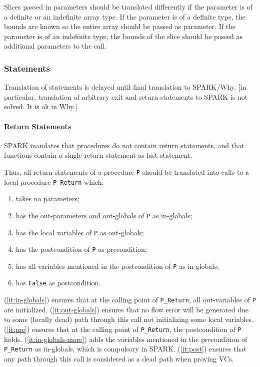 \documentclass{article}
\begin{document}
Slices passed in parameters should be translated differently if the parameter
is of a definite or an indefinite array type. If the parameter is of a definite
type, the bounds are known so the entire array should be passed as
parameter. If the parameter is of an indefinite type, the bounds of the slice
should be passed as additional parameters to the call.

\subsubsection{Statements}

Translation of statements is delayed until final translation to SPARK/Why. [in
particular, translation of arbitrary exit and return statements to SPARK is not
solved. It is ok in Why.]

\paragraph{Return Statements} 

SPARK mandates that procedures do not contain return statements, and that
functions contain a single return statement as last statement. 

Thus, all return
statements of a procedure \verb|P| should be translated into calls to a local
procedure \verb|P_Return| which:
\begin{enumerate}
\item \label{it:no-param} takes no parameters;
\item \label{it:in-globals} has the out-parameters and out-globals of \verb|P|
  as in-globals;
\item \label{it:out-globals} has the local variables of \verb|P| as out-globals;
\item \label{it:pre} has the postcondition of \verb|P| as precondition;
\item \label{it:in-globals-more} has all variables mentioned in the
  postcondition of \verb|P| as in-globals;
\item \label{it:post} has \verb|False| as postcondition.
\end{enumerate}
(\ref{it:in-globals}) ensures that at the calling point of \verb|P_Return|, all
out-variables of \verb|P| are initialized. (\ref{it:out-globals}) ensures that
no flow error will be generated due to some (locally dead) path through this
call not initializing some local variables. (\ref{it:pre}) ensures that at the
calling point of \verb|P_Return|, the postcondition of \verb|P|
holds. (\ref{it:in-globals-more}) adds the variables mentioned in the
precondition of \verb|P_Return| as in-globals, which is compulsory in SPARK.
(\ref{it:post}) ensures that any path through this call is considered as a dead
path when proving VCs.
\end{document}
